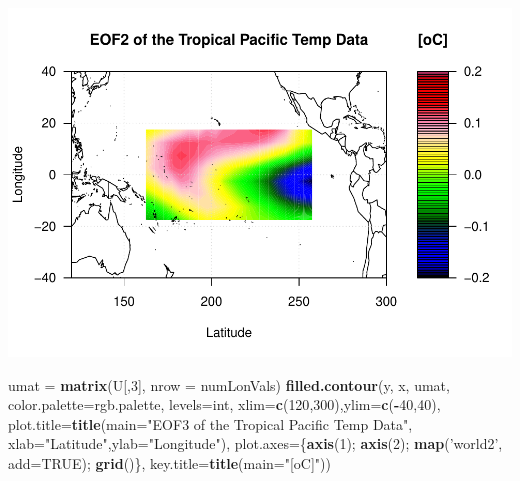 \documentclass[
]{article}
\newenvironment{Shaded}{\begin{snugshade}}{\end{snugshade}}
\newcommand{\DataTypeTok}[1]{\textcolor[rgb]{0.13,0.29,0.53}{#1}}
\newcommand{\DecValTok}[1]{\textcolor[rgb]{0.00,0.00,0.81}{#1}}
\newcommand{\KeywordTok}[1]{\textcolor[rgb]{0.13,0.29,0.53}{\textbf{#1}}}
\newcommand{\NormalTok}[1]{#1}
\newcommand{\OperatorTok}[1]{\textcolor[rgb]{0.81,0.36,0.00}{\textbf{#1}}}
\newcommand{\OtherTok}[1]{\textcolor[rgb]{0.56,0.35,0.01}{#1}}
\newcommand{\StringTok}[1]{\textcolor[rgb]{0.31,0.60,0.02}{#1}}
\begin{document}
\includegraphics{Assignment3_files/figure-latex/unnamed-chunk-1-2.pdf}

\begin{Shaded}
\begin{Highlighting}[]
\NormalTok{umat =}\StringTok{ }\KeywordTok{matrix}\NormalTok{(U[,}\DecValTok{3}\NormalTok{], }\DataTypeTok{nrow =}\NormalTok{ numLonVals)}
\KeywordTok{filled.contour}\NormalTok{(y, x, umat, }\DataTypeTok{color.palette=}\NormalTok{rgb.palette, }\DataTypeTok{levels=}\NormalTok{int,}
               \DataTypeTok{xlim=}\KeywordTok{c}\NormalTok{(}\DecValTok{120}\NormalTok{,}\DecValTok{300}\NormalTok{),}\DataTypeTok{ylim=}\KeywordTok{c}\NormalTok{(}\OperatorTok{-}\DecValTok{40}\NormalTok{,}\DecValTok{40}\NormalTok{),}
               \DataTypeTok{plot.title=}\KeywordTok{title}\NormalTok{(}\DataTypeTok{main=}\StringTok{"EOF3 of the Tropical Pacific Temp Data"}\NormalTok{,}
                                \DataTypeTok{xlab=}\StringTok{"Latitude"}\NormalTok{,}\DataTypeTok{ylab=}\StringTok{"Longitude"}\NormalTok{),}
               \DataTypeTok{plot.axes=}\NormalTok{\{}\KeywordTok{axis}\NormalTok{(}\DecValTok{1}\NormalTok{); }\KeywordTok{axis}\NormalTok{(}\DecValTok{2}\NormalTok{); }\KeywordTok{map}\NormalTok{(}\StringTok{'world2'}\NormalTok{, }\DataTypeTok{add=}\OtherTok{TRUE}\NormalTok{); }\KeywordTok{grid}\NormalTok{()\},}
               \DataTypeTok{key.title=}\KeywordTok{title}\NormalTok{(}\DataTypeTok{main=}\StringTok{"[oC]"}\NormalTok{))}
\end{Highlighting}
\end{Shaded}
\end{document}
